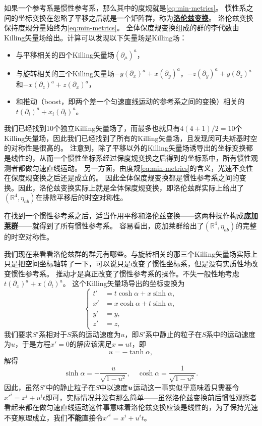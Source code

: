 \documentclass[hyperref, UTF8, a4paper]{ctexart}
\renewcommand{\emph}[1]{\textbf{#1}}
\newcommand*{\concept}[1]{\underline{\textbf{#1}}}
\begin{document}
如果一个参考系是惯性参考系，那么其中的度规就是\eqref{eq:min-metrics}。
惯性系之间的坐标变换在忽略了平移之后就是一个矩阵群，称为\concept{洛伦兹变换}。
洛伦兹变换保持度规分量始终为\eqref{eq:min-metrics}。
全体保度规变换组成的群的李代数由Killing矢量场给出。计算可以发现以下矢量场是Killing场：
\begin{itemize}
    \item 与平移相关的四个Killing矢量场$(\partial_\mu)^a$，
    \item 与旋转相关的三个Killing矢量场$-y (\partial_x)^a + x (\partial_y)^a$，$-z (\partial_y)^a + y (\partial_z)^a$和$-x (\partial_z)^a + z (\partial_x)^a$，
    \item 和推动（boost，即两个差一个匀速直线运动的参考系之间的变换）相关的$t (\partial_i)^a + x_i (\partial_t)^a$。
\end{itemize}
我们已经找到10个独立Killing矢量场了，而最多也就只有$4(4+1)/2=10$个Killing矢量场，因此我们已经找到了所有的Killing矢量场，且发现闵可夫斯基时空的对称性是很高的。
注意到，除了平移以外的Killing矢量场诱导出的坐标变换都是线性的，从而一个惯性坐标系经过保度规变换之后得到的坐标系中，所有惯性观测者都做匀速直线运动。
另一方面，由度规\eqref{eq:min-metrics}的含义，光速不变性在保度规变换之后还是成立的。
因此全体保度规变换都是惯性参考系之间的变换。因此，洛伦兹变换实际上就是全体保度规变换，即洛伦兹群实际上给出了$(\mathbb{R}^4, \eta_{ab})$在排除平移后的时空对称性。

在找到一个惯性参考系之后，适当作用平移和洛伦兹变换——这两种操作构成\concept{庞加莱群}——就得到了所有惯性参考系。
容易看出，庞加莱群给出了$(\mathbb{R}^4, \eta_{ab})$的完整的时空对称性。

我们现在来看看洛伦兹群的群元有哪些。与旋转相关的那三个Killing矢量场实际上只是把空间坐标轴转了一下，可以说只是改变了惯性坐标系，但是没有实质性地改变惯性参考系。
推动才是真正改变了惯性参考系的操作。不失一般性地考虑$t (\partial_x)^a + x (\partial_t)^a$。
这个Killing矢量场导出的坐标变换为
\begin{equation}
    \left\{
        \begin{aligned}
            t' &= t \cosh \alpha + x \sinh \alpha , \\
            x' &= x \cosh \alpha + t \sinh \alpha, \\
            y' &= y, \\
            z' &= z,
        \end{aligned}
    \right.
\end{equation}
我们要求$S'$系相对于$S$系的运动速度为$u$，即$S'$系中静止的粒子在$S$系中的运动速度为$u$，于是方程$x'=0$的解应该满足$x=ut$，即
\[
    u = - \tanh \alpha,
\]
解得
\begin{equation}
    \sinh \alpha = - \frac{u}{\sqrt{1 - u^2}}, \quad \cosh \alpha = \frac{1}{\sqrt{1 - u^2}}.
\end{equation}
因此，虽然$S'$中的静止粒子在$S$中以速度$\vb*{u}$运动这一事实似乎意味着只需要令$x'^i = x^i + u^i t$即可，实际情况并没有那么简单——虽然洛伦兹变换前后惯性观察者看起来都在做匀速直线运动这件事意味着洛伦兹变换应该是线性的，为了保持光速不变原理成立，我们\emph{不能}直接令$x'^i = x^i + u^i t$。
\end{document}
